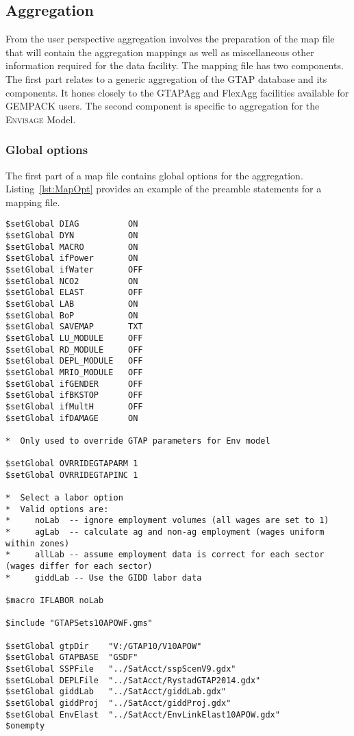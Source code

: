 \subsection{Aggregation}

From the user perspective aggregation involves the preparation of the map file
that will contain the aggregation mappings as well as miscellaneous other
information required for the data facility. The mapping file has two components.
The first part relates to a generic aggregation of the GTAP database and its
components. It hones closely to the GTAPAgg and FlexAgg facilities available for
GEMPACK users. The second component is specific to aggregation for the
\textsc{Envisage} Model.

\subsubsection{Global options}

The first part of a map file contains global options for the aggregation.
Listing~\ref{lst:MapOpt} provides an example of the preamble statements for a
mapping file.
\begin{lstlisting}[language=GAMS, caption={Global options for the MAP file}, label=lst:MapOpt]
$setGlobal DIAG          ON
$setGlobal DYN           ON
$setGlobal MACRO         ON
$setGlobal ifPower       ON
$setGlobal ifWater       OFF
$setGlobal NCO2          ON
$setGlobal ELAST         OFF
$setGlobal LAB           ON
$setGlobal BoP           ON
$setGlobal SAVEMAP       TXT
$setGlobal LU_MODULE     OFF
$setGlobal RD_MODULE     OFF
$setGlobal DEPL_MODULE   OFF
$setGlobal MRIO_MODULE   OFF
$setGlobal ifGENDER      OFF
$setGlobal ifBKSTOP      OFF
$setGlobal ifMultH       OFF
$setGlobal ifDAMAGE      ON

*  Only used to override GTAP parameters for Env model

$setGlobal OVRRIDEGTAPARM 1
$setGlobal OVRRIDEGTAPINC 1

*  Select a labor option
*  Valid options are:
*     noLab  -- ignore employment volumes (all wages are set to 1)
*     agLab  -- calculate ag and non-ag employment (wages uniform within zones)
*     allLab -- assume employment data is correct for each sector (wages differ for each sector)
*     giddLab -- Use the GIDD labor data

$macro IFLABOR noLab

$include "GTAPSets10APOWF.gms"

$setGlobal gtpDir    "V:/GTAP10/V10APOW"
$setGlobal GTAPBASE  "GSDF"
$setGlobal SSPFile   "../SatAcct/sspScenV9.gdx"
$setGLobal DEPLFile  "../SatAcct/RystadGTAP2014.gdx"
$setGlobal giddLab   "../SatAcct/giddLab.gdx"
$setGlobal giddProj  "../SatAcct/giddProj.gdx"
$setGlobal EnvElast  "../SatAcct/EnvLinkElast10APOW.gdx"
$onempty
\end{lstlisting}

